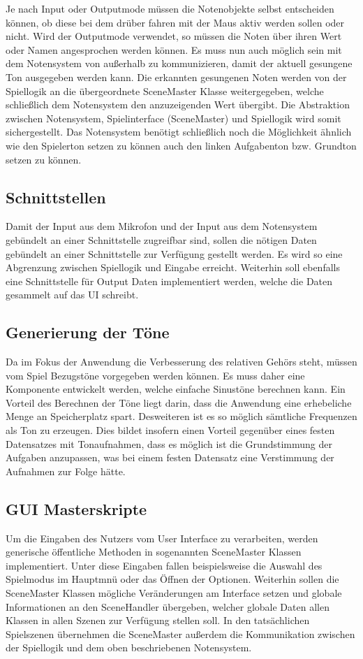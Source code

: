 Je nach Input oder Outputmode müssen die Notenobjekte selbst entscheiden können, ob diese bei dem drüber fahren mit der Maus aktiv werden sollen oder nicht. Wird der Outputmode verwendet, so müssen die Noten über ihren Wert oder Namen angesprochen werden können. Es muss nun auch möglich sein mit dem Notensystem von außerhalb zu kommunizieren, damit der aktuell gesungene Ton ausgegeben werden kann. Die erkannten gesungenen Noten werden von der Spiellogik an die übergeordnete SceneMaster Klasse weitergegeben, welche schließlich dem Notensystem den anzuzeigenden Wert übergibt. Die Abstraktion zwischen Notensystem, Spielinterface (SceneMaster) und Spiellogik wird somit sichergestellt.
Das Notensystem benötigt schließlich noch die Möglichkeit ähnlich wie den Spielerton setzen zu können auch den linken Aufgabenton bzw. Grundton setzen zu können.\\

\subsection{Schnittstellen}
Damit der Input aus dem Mikrofon und der Input aus dem Notensystem gebündelt an einer Schnittstelle zugreifbar sind, sollen die nötigen Daten gebündelt an einer Schnittstelle zur Verfügung gestellt werden. Es wird so eine Abgrenzung zwischen Spiellogik und Eingabe erreicht. Weiterhin soll ebenfalls eine Schnittstelle für Output Daten implementiert werden, welche die Daten gesammelt auf das UI schreibt.

\subsection{Generierung der Töne}
Da im Fokus der Anwendung die Verbesserung des relativen Gehörs steht, müssen vom Spiel Bezugstöne vorgegeben werden können. Es muss daher eine Komponente entwickelt werden, welche einfache Sinustöne berechnen kann. Ein Vorteil des Berechnen der Töne liegt darin, dass die Anwendung eine erhebeliche Menge an Speicherplatz spart. Desweiteren ist es so möglich sämtliche Frequenzen als Ton zu erzeugen. Dies bildet insofern einen Vorteil gegenüber eines festen Datensatzes mit Tonaufnahmen, dass es möglich ist die Grundstimmung der Aufgaben anzupassen, was bei einem festen Datensatz eine Verstimmung der Aufnahmen zur Folge hätte. 

\subsection{GUI Masterskripte}
Um die Eingaben des Nutzers vom User Interface zu verarbeiten, werden generische öffentliche Methoden in sogenannten SceneMaster Klassen implementiert. Unter diese Eingaben fallen beispielsweise die Auswahl des Spielmodus im Hauptmnü oder das Öffnen der Optionen. Weiterhin sollen die SceneMaster Klassen mögliche Veränderungen am Interface setzen und globale Informationen an den SceneHandler übergeben, welcher globale Daten allen Klassen in allen Szenen zur Verfügung stellen soll. In den tatsächlichen Spielszenen übernehmen die SceneMaster außerdem die Kommunikation zwischen der Spiellogik und dem oben beschriebenen Notensystem.

